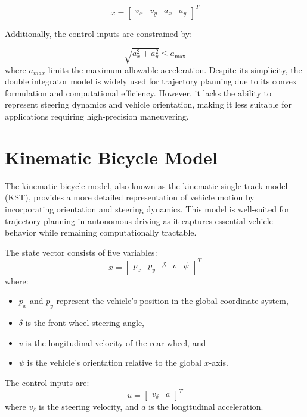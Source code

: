 \begin{equation}
	\dot{x} = \begin{bmatrix}
		v_x &
		v_y &
		a_x &
		a_y
	\end{bmatrix}^T
\end{equation}

Additionally, the control inputs are constrained by:

\begin{equation}
	\label{eq:acceleration_constraint_preliminaries_di}
	\sqrt{a_x^2 + a_y^2} \leq a_{\max}
\end{equation}
where $a_{max}$ limits the maximum allowable acceleration.
Despite its simplicity, the double integrator model is widely used for trajectory planning due to its convex formulation and computational
efficiency.
However, it lacks the ability to represent steering dynamics and vehicle orientation, making it less suitable for applications requiring
high-precision maneuvering.

\section{Kinematic Bicycle Model} \label{subsec:bicycle_model}

The kinematic bicycle model, also known as the kinematic single-track model (KST), provides a more detailed representation of vehicle motion by
incorporating orientation and steering dynamics.
This model is well-suited for trajectory planning in autonomous driving as it captures essential vehicle behavior while remaining computationally
tractable.

The state vector consists of five variables:
\begin{equation}
	x = \begin{bmatrix} p_x & p_y & \delta & v & \psi \end{bmatrix}^T
	\label{eq:states_kst}
\end{equation}
where:
\begin{itemize}
	\item $p_x$ and $p_y$ represent the vehicle's position in the global coordinate system,
	\item $\delta$ is the front-wheel steering angle,
	\item $v$ is the longitudinal velocity of the rear wheel, and
	\item $\psi$ is the vehicle's orientation relative to the global $x$-axis.
\end{itemize}

The control inputs are:
\begin{equation}
	u = \begin{bmatrix} v_{\delta} & a \end{bmatrix}^T
	\label{eq:controls_kst}
\end{equation}
where $v_{\delta}$ is the steering velocity, and $a$ is the longitudinal acceleration.

